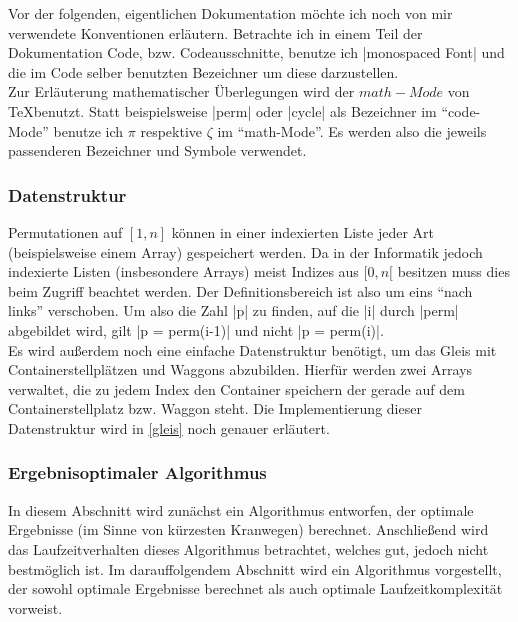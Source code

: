 Vor der folgenden, eigentlichen Dokumentation möchte ich noch von mir verwendete Konventionen erläutern.
Betrachte ich in einem Teil der Dokumentation Code, bzw. Codeausschnitte,
benutze ich |monospaced Font| und die im Code selber benutzten Bezeichner um diese darzustellen. \\
Zur Erläuterung mathematischer Überlegungen wird der $math-Mode$ von \TeX benutzt.
Statt beispielsweise |perm| oder |cycle| als Bezeichner im ``code-Mode'' benutze ich $\pi$ respektive $\zeta$ im ``math-Mode''.
Es werden also die jeweils passenderen Bezeichner und Symbole verwendet.
\subsubsection{Datenstruktur}
Permutationen auf $[1,n]$ können in einer indexierten Liste jeder Art (beispielsweise einem Array) gespeichert werden.
Da in der Informatik jedoch indexierte Listen (insbesondere Arrays) meist Indizes aus $[0,n[$ besitzen muss dies beim Zugriff beachtet werden.
Der Definitionsbereich ist also um eins ``nach links'' verschoben.
Um also die Zahl |p| zu finden, auf die |i| durch |perm| abgebildet wird, gilt |p = perm(i-1)| und nicht |p = perm(i)|. \\
Es wird außerdem noch eine einfache Datenstruktur benötigt, um das Gleis mit Containerstellplätzen und Waggons abzubilden.
Hierfür werden zwei Arrays verwaltet, die zu jedem Index den Container speichern der gerade auf dem Containerstellplatz bzw. Waggon steht.
Die Implementierung dieser Datenstruktur wird in \ref{gleis} noch genauer erläutert.
\subsubsection{Ergebnisoptimaler Algorithmus}
In diesem Abschnitt wird zunächst ein Algorithmus entworfen, der optimale Ergebnisse (im Sinne von kürzesten Kranwegen) berechnet.
Anschließend wird das Laufzeitverhalten dieses Algorithmus betrachtet, welches gut, jedoch nicht bestmöglich ist.
Im darauffolgendem Abschnitt wird ein Algorithmus vorgestellt, der sowohl optimale Ergebnisse berechnet als auch optimale Laufzeitkomplexität vorweist.
